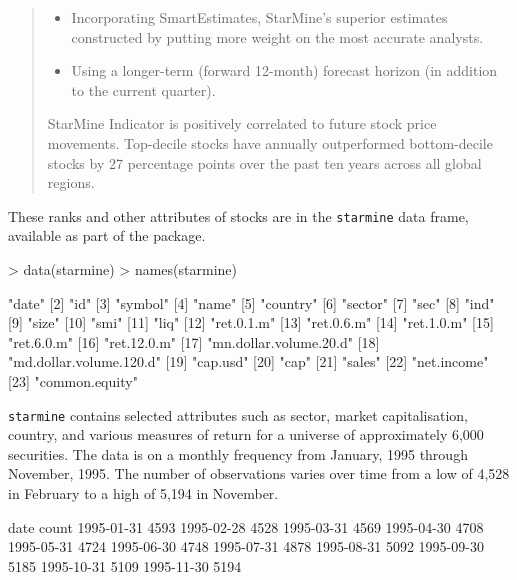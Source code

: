 \documentclass[a4paper]{report}
\begin{document}
\begin{article}
\begin{quote}
\begin{itemize}
\item Incorporating SmartEstimates, StarMine's superior estimates
  constructed by putting more weight on the most accurate analysts.
  
\item Using a longer-term (forward 12-month) forecast horizon (in
  addition to the current quarter).

\end{itemize}

StarMine Indicator is positively correlated to future stock price
movements. Top-decile stocks have annually outperformed bottom-decile
stocks by 27 percentage points over the past ten years across all
global regions.
\end{quote}

\normalsize

These ranks and other attributes of stocks are in the
\texttt{starmine} data frame, available as part of the
 package.


\begin{Schunk}
\begin{Sinput}
> data(starmine)
> names(starmine)
\end{Sinput}
\begin{Soutput}
 [1] "date"                  
 [2] "id"                    
 [3] "symbol"                
 [4] "name"                  
 [5] "country"               
 [6] "sector"                
 [7] "sec"                   
 [8] "ind"                   
 [9] "size"                  
[10] "smi"                   
[11] "liq"                   
[12] "ret.0.1.m"             
[13] "ret.0.6.m"             
[14] "ret.1.0.m"             
[15] "ret.6.0.m"             
[16] "ret.12.0.m"            
[17] "mn.dollar.volume.20.d" 
[18] "md.dollar.volume.120.d"
[19] "cap.usd"               
[20] "cap"                   
[21] "sales"                 
[22] "net.income"            
[23] "common.equity"         
\end{Soutput}
\end{Schunk}

\texttt{starmine} contains selected attributes such as sector, market
capitalisation, country, and various measures of return for a universe
of approximately 6,000 securities.  The data is on a monthly frequency
from January, 1995 through November, 1995.  The number of observations
varies over time from a low of 4,528 in February to a high of 5,194 in
November.

\begin{Schunk}
\begin{Soutput}
      date count
1995-01-31  4593
1995-02-28  4528
1995-03-31  4569
1995-04-30  4708
1995-05-31  4724
1995-06-30  4748
1995-07-31  4878
1995-08-31  5092
1995-09-30  5185
1995-10-31  5109
1995-11-30  5194
\end{Soutput}
\end{Schunk}


\end{article}
\end{document}
